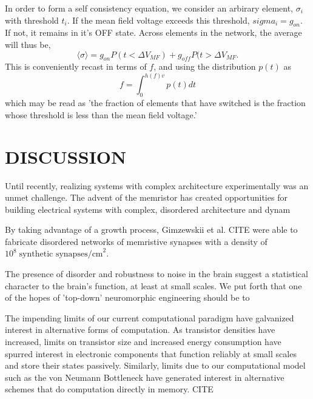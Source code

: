 \documentclass[aps,prl,preprint,groupedaddress]{revtex4-1}
\begin{document}
In order to form a self consistency equation, we consider an arbirary element,
$\sigma_i$ with threshold $t_i$.  If the mean field voltage exceeds this
threshold, $sigma_i = g_{on}$. If not, it remains in it's OFF state. Across
elements in the network, the average will thus be,
\[\langle \sigma \rangle = g_{on} P(t < \Delta V_{MF}) + 
g_{off} P(t> \Delta V_{MF}.\]
This is conveniently recast in terms of $f$, and using the distribution
$p(t)$ as
\[f = \int_0^{h(f) v} p(t) dt\]
which may be read as 'the fraction of elements that have switched is the
fraction whose threshold is less than the mean field voltage.'

\section{DISCUSSION}


Until recently, realizing systems with complex architecture
experimentally was an unmet challenge.  The advent of the memristor has
created opportunities for building electrical systems with complex, disordered
architecture and dynam

By taking advantage of a growth process, Gimzewskii et
al. CITE were able to fabricate disordered networks of memristive synapses
with a density of $10^8\; \text{synthetic synapses/cm}^2$.

The presence of disorder and robustness to noise in the brain
suggest a statistical character to the brain's function, at least at small
scales.  We put forth that one of the hopes of 'top-down' neuromorphic
engineering should be to 

The impending limits of our current computational paradigm have galvanized
interest in alternative forms of computation. As transistor densities have
increased, limits on transistor size and increased energy consumption have
spurred interest in electronic components that function reliably at small
scales and store their states passively.  Similarly, limits due to our
computational model such as the von Neumann Bottleneck have generated
interest in alternative schemes that do computation directly in memory.
CITE
\end{document}
